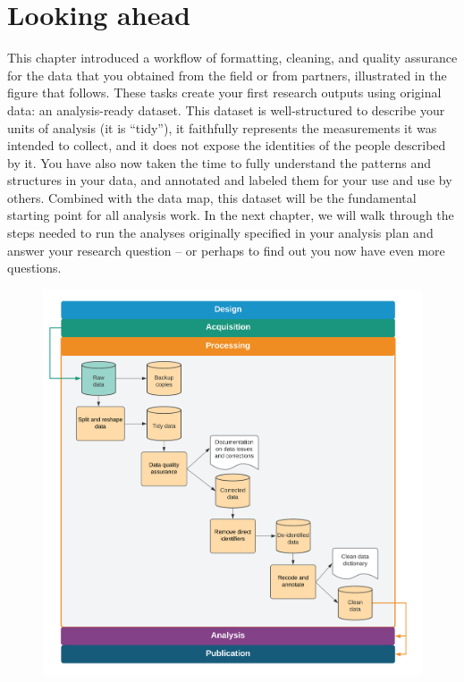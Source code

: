 \section{Looking ahead}
This chapter introduced a workflow of formatting, cleaning, and quality assurance for
the data that you obtained from the field or from partners,
illustrated in the figure that follows.
These tasks create your first research outputs using original data:
an analysis-ready dataset.
This dataset is well-structured to describe your units of analysis (it is ``tidy''),
it faithfully represents the measurements it was intended to collect,
and it does not expose the identities of the people described by it.
You have also now taken the time to fully understand the patterns and structures
in your data, and annotated and labeled them for your use and use by others.
Combined with the data map, this dataset
will be the fundamental starting point for all analysis work.
In the next chapter, we will walk through the steps needed
to run the analyses originally specified in your analysis plan
and answer your research question --
or perhaps to find out you now have even more questions.

\begin{fullwidth}
	\begin{figure}
		\centering
		\includegraphics[width=1.6\linewidth]{diagrams/Cleaning}
		\label{fig:cleaning}
	\end{figure}
\end{fullwidth}

